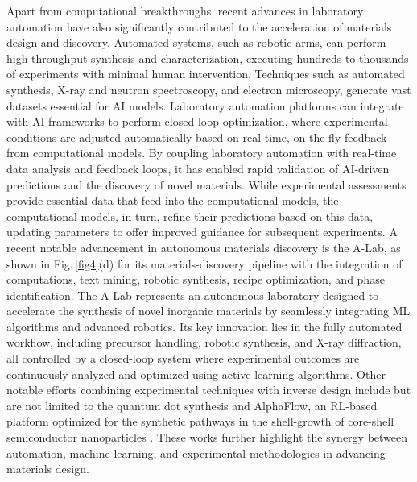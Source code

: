 \documentclass[fleqn,10pt]{wlscirep}
\begin{document}
Apart from computational breakthroughs, recent advances in laboratory automation have also significantly contributed to the acceleration of materials design and discovery. Automated systems, such as robotic arms, can perform high-throughput synthesis and characterization, executing hundreds to thousands of experiments with minimal human intervention. Techniques such as automated synthesis, X-ray and neutron spectroscopy, and electron microscopy, generate vast datasets essential for AI models. Laboratory automation platforms can integrate with AI frameworks to perform closed-loop optimization, where experimental conditions are adjusted automatically based on real-time, on-the-fly feedback from computational models. By coupling laboratory automation with real-time data analysis and feedback loops, it has enabled rapid validation of AI-driven predictions and the discovery of novel materials. While experimental assessments provide essential data that feed into the computational models, the computational models, in turn, refine their predictions based on this data, updating parameters to offer improved guidance for subsequent experiments. 
A recent notable advancement in autonomous materials discovery is the A-Lab, \cite{szymanski2023autonomous} as shown in Fig.\,\ref{fig4}(d) for its materials-discovery pipeline with the integration of computations, text mining, robotic synthesis, recipe optimization, and phase identification. The A-Lab represents an autonomous laboratory designed to accelerate the synthesis of novel inorganic materials by seamlessly integrating ML algorithms and advanced robotics. Its key innovation lies in the fully automated workflow, including precursor handling, robotic synthesis, and X-ray diffraction, all controlled by a closed-loop system where experimental outcomes are continuously analyzed and optimized using active learning algorithms. Other notable efforts combining experimental techniques with inverse design include but are not limited to the quantum dot synthesis \cite{epps2020artificial} and AlphaFlow, an RL-based platform optimized for the synthetic pathways in the shell-growth of core-shell semiconductor nanoparticles \cite{volk2023alphaflow}. These works further highlight the synergy between automation, machine learning, and experimental methodologies in advancing materials design.
\end{document}
